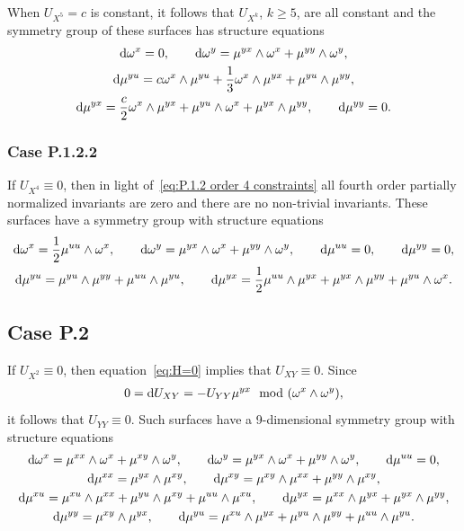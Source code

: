 \documentclass[pdftex]{sigma}%
\numberwithin{equation}{section}
\begin{document}
When $U_{X^5}=c$ is constant, it follows that $U_{X^k}$, $k\geq 5$, are all constant and the symmetry group of these surfaces has structure equations
\begin{gather*}
{\rm d}\omega^x=0,\qquad
{\rm d}\omega^y=\mu^{yx}\wedge \omega^x +\mu^{yy}\wedge \omega^y,
\\
{\rm d}\mu^{yu} = c \omega^x\wedge \mu^{yu}+\frac{1}{3}\omega^x\wedge \mu^{yx}+\mu^{yu}\wedge \mu^{yy},\\
{\rm d}\mu^{yx} = \frac{c}{2} \omega^x\wedge \mu^{yx}+\mu^{yu}\wedge \omega^x+\mu^{yx}\wedge \mu^{yy},\qquad
 {\rm d}\mu^{yy}= 0.
\end{gather*}

\subsubsection{Case P.1.2.2}

If $U_{X^4}\equiv 0$, then in light of~\eqref{eq:P.1.2 order 4 constraints} all fourth order partially normalized invariants are zero and there are no non-trivial invariants. These surfaces have a symmetry group with structure equations
%
\begin{gather*}
{\rm d}\omega^x=\frac{1}{2}\mu^{uu}\wedge\omega^x,\qquad
{\rm d}\omega^y = \mu^{yx} \wedge \omega^x+\mu^{yy}\wedge \omega^y,\qquad {\rm d}\mu^{uu}=0,\qquad {\rm d}\mu^{yy}=0,\\
{\rm d}\mu^{yu}=\mu^{yu}\wedge \mu^{yy}+\mu^{uu}\wedge \mu^{yu},\qquad
{\rm d}\mu^{yx}=\frac{1}{2}\mu^{uu}\wedge \mu^{yx}+\mu^{yx}\wedge \mu^{yy}+\mu^{yu}\wedge \omega^x.
\end{gather*}

\subsection{Case P.2}

If $U_{X^2} \equiv 0$, then equation~\eqref{eq:H=0} implies that $U_{XY} \equiv 0$. Since
\begin{gather*}
0={\rm d}U_{XY}=-U_{YY}\mu^{yx} \mod(\omega^x\wedge \omega^y),
\end{gather*}
it follows that $U_{YY}\equiv 0$. Such surfaces have a 9-dimensional symmetry group with structure equations
%
\begin{gather*}
{\rm d}\omega^x=\mu^{xx}\wedge \omega^x+\mu^{xy}\wedge \omega^y,\qquad
{\rm d}\omega^y = \mu^{yx}\wedge \omega^x + \mu^{yy}\wedge \omega^y,\qquad {\rm d}\mu^{uu}=0,\\
{\rm d}\mu^{xx} = \mu^{yx}\wedge \mu^{xy},\qquad
{\rm d}\mu^{xy} = \mu^{xy}\wedge \mu^{xx}+\mu^{yy}\wedge \mu^{xy},\\
{\rm d}\mu^{xu}=\mu^{xu}\wedge \mu^{xx} + \mu^{yu}\wedge \mu^{xy}+\mu^{uu}\wedge \mu^{xu},\qquad
{\rm d}\mu^{yx}=\mu^{xx}\wedge \mu^{yx}+\mu^{yx}\wedge \mu^{yy},\\
{\rm d}\mu^{yy}=\mu^{xy}\wedge \mu^{yx},\qquad
{\rm d}\mu^{yu} = \mu^{xu}\wedge\mu^{yx}+\mu^{yu}\wedge \mu^{yy}+\mu^{uu}\wedge\mu^{yu}.
\end{gather*}
\end{document}
